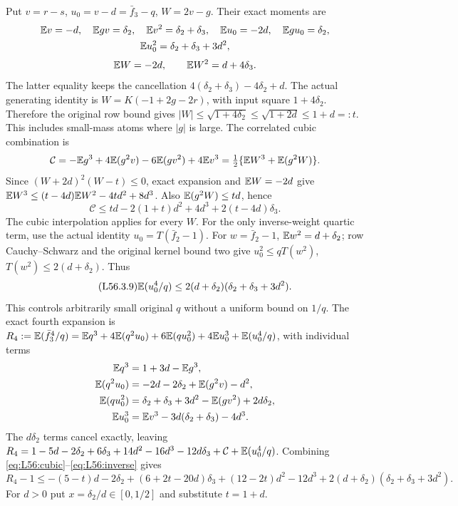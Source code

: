 Put $v=r-s$, $u_0=v-d=\bar f_3-q$, $W=2v-g$.
Their exact moments are
\[
\begin{gathered}
\mathbb E v=-d,\quad \mathbb E gv=\delta_2,\quad \mathbb E v^2=\delta_2+\delta_3,\quad \mathbb E u_0=-2d,\quad \mathbb E gu_0=\delta_2,\\
\mathbb E u_0^2=\delta_2+\delta_3+3d^2,
\end{gathered}
\]
\[
\mathbb E W=-2d,\qquad\mathbb E W^2=d+4\delta_3.
\]
The latter equality keeps the cancellation
$4(\delta_2+\delta_3)-4\delta_2+d$.
The actual generating identity is $W=K(-1+2g-2r)$,
with input square $1+4\delta_2$. Therefore the original row bound
gives $|W|\le\sqrt{1+4\delta_2}\le\sqrt{1+2d}\le1+d=:t$.
This includes small-mass atoms where $|g|$ is large.
The correlated cubic combination is
\[
\mathcal C=-\mathbb E g^3+4\mathbb E(g^2v)-6\mathbb E(gv^2)+4\mathbb E v^3
=\tfrac12\{\mathbb E W^3+\mathbb E(g^2W)\}.
\]
Since $(W+2d)^2(W-t)\le0$, exact expansion and
$\mathbb E W=-2d$ give
$\mathbb E W^3\le(t-4d)\mathbb E W^2-4td^2+8d^3$.
Also $\mathbb E(g^2W)\le td$, hence
\begin{equation}\tag{L56.3.8}\label{eq:L56:cubic}
\mathcal C\le td-2(1+t)d^2+4d^3+2(t-4d)\delta_3.
\end{equation}
The cubic interpolation applies for every $W$.
For the only inverse-weight quartic term, use the actual identity
$u_0=T(\bar f_2-1)$.
For $w=\bar f_2-1$, $\mathbb E w^2=d+\delta_2$;
row Cauchy--Schwarz and the original kernel bound two give
$u_0^2\le qT(w^2)$, $T(w^2)\le2(d+\delta_2)$.
Thus
\begin{equation}\tag{L56.3.9}\label{eq:L56:inverse}
\mathbb E(u_0^4/q)\le2(d+\delta_2)(\delta_2+\delta_3+3d^2).
\end{equation}
This controls arbitrarily small original $q$ without a uniform bound
on $1/q$.
The exact fourth expansion is
$R_4:=\mathbb E(\bar f_3^4/q)
=\mathbb E q^3+4\mathbb E(q^2u_0)+6\mathbb E(qu_0^2)+4\mathbb E u_0^3+\mathbb E(u_0^4/q)$,
with individual terms
\[
\begin{aligned}
\mathbb E q^3&=1+3d-\mathbb E g^3,\\
\mathbb E(q^2u_0)&=-2d-2\delta_2+\mathbb E(g^2v)-d^2,\\
\mathbb E(qu_0^2)&=\delta_2+\delta_3+3d^2-\mathbb E(gv^2)+2d\delta_2,\\
\mathbb E u_0^3&=\mathbb E v^3-3d(\delta_2+\delta_3)-4d^3.
\end{aligned}
\]
The $d\delta_2$ terms cancel exactly, leaving
$R_4=1-5d-2\delta_2+6\delta_3+14d^2-16d^3
-12d\delta_3+\mathcal C+\mathbb E(u_0^4/q)$.
Combining \eqref{eq:L56:cubic}--\eqref{eq:L56:inverse} gives
\[
R_4-1\le-(5-t)d-2\delta_2+(6+2t-20d)\delta_3
+(12-2t)d^2-12d^3
+2(d+\delta_2)(\delta_2+\delta_3+3d^2).
\]
For $d>0$ put $x=\delta_2/d\in[0,1/2]$ and substitute $t=1+d$.
